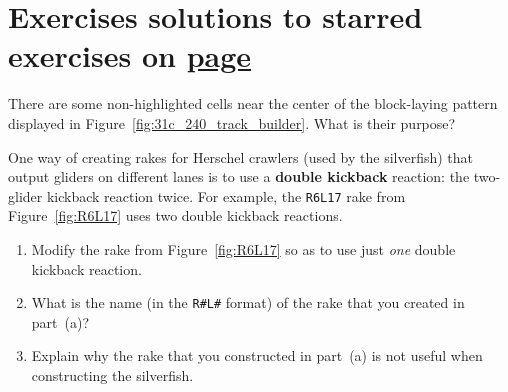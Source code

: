 \section*{Exercises \hfill \normalfont\textsf{\small solutions to starred exercises on \hyperlink{solutions_self_support_spaceships}{page \pageref{solutions_self_support_spaceships}}}}
\label{sec:solutions_self_support_spaceships}
\vspace*{-0.4cm}\hrulefill\vspace*{-0.3cm}\footnotesize\begin{multicols}{2}\vspace*{-0.4cm}\raggedcolumns{}
	\setlength{\parskip}{0pt}
	
	
	\begin{problem}\label{exer:self_support_spaceships_track_layer_rephaser} 
		There are some non-highlighted cells near the center of the block-laying pattern displayed in Figure~\ref{fig:31c_240_track_builder}. What is their purpose?
	\end{problem}
	
	
	\mfilbreak
	
	
	\begin{problemstar}\label{exer:self_support_spaceships_r4l1}
		One way of creating rakes for Herschel crawlers (used by the silverfish) that output gliders on different lanes is to use a \textbf{double kickback} reaction: the two-glider kickback reaction twice. For example, the \texttt{R6L17} rake from Figure~\ref{fig:R6L17} uses two double kickback reactions.\smallskip
		
		\begin{enumerate}[label=\bf\color{ocre}(\alph*)]
			\item {} Modify the rake from Figure~\ref{fig:R6L17} so as to use just \emph{one} double kickback reaction.
			
			\item {} What is the name (in the \texttt{R\#L\#} format) of the rake that you created in part~(a)?
			
			\item {} Explain why the rake that you constructed in part~(a) is not useful when constructing the silverfish.
		\end{enumerate}
	\end{problemstar}
	

\end{multicols}
